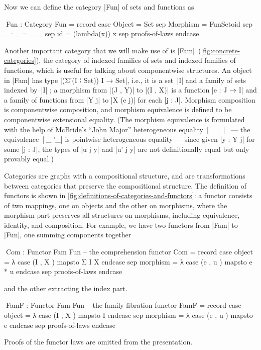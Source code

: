 Now we can define the category |Fun| of sets and functions as
\begin{code}
^^^Fun : Category
Fun = record  case  Object    =  Set
              sep   Morphism  =  FunSetoid
              sep   _·_  =  _∘_
              sep   id   =  (lambda(x)) x
              sep   proofs-of-laws endcase
\end{code}
Another important category that we will make use of is |Fam|~(\autoref{fig:concrete-categories}), the category of indexed families of sets and indexed families of functions, which is useful for talking about componentwise structures.
An object in |Fam| has type |(Σ'(I ∶ Set)) I → Set|, i.e., it is a set~|I| and a family of sets indexed by~|I| ;
a morphism from |(J , Y)| to |(I , X)| is a function |e : J → I| and a family of functions from |Y j| to |X (e j)| for each |j : J|.
Morphism composition is componentwise composition, and morphism equivalence is defined to be componentwise extensional equality.
(The morphism equivalence is formulated with the help of McBride's ``John Major'' heterogeneous equality~|^^^_≊_|~\citep{McBride-thesis} --- the equivalence~|^^^_≊'_| is pointwise heterogeneous equality --- since given |y : Y j| for some |j : J|, the types of |u {j} y| and |u' {j} y| are not definitionally equal but only provably equal.)

Categories are graphs with a compositional structure, and  are transformations between categories that preserve the compositional structure.
The definition of functors is shown in \autoref{fig:definitions-of-categories-and-functors}: a functor consists of two mappings, one on objects and the other on morphisms, where the morphism part preserves all structures on morphisms, including equivalence, identity, and composition.
For example, we have two functors from |Fam| to |Fun|, one summing components together
\begin{code}
^^^Com : Functor Fam Fun  -- the comprehension functor
Com = record  case  object    =  λ case (I  ,  X  ) mapsto Σ I X  endcase
              sep   morphism  =  λ case (e  ,  u  ) mapsto e * u  endcase
              sep   proofs-of-laws endcase
\end{code}
and the other extracting the index part.
\begin{code}
^^^FamF : Functor Fam Fun  -- the family fibration functor
FamF = record  case  object    =  λ case (I  ,  X  ) mapsto I  endcase
               sep   morphism  =  λ case (e  ,  u  ) mapsto e  endcase
               sep   proofs-of-laws endcase
\end{code}
Proofs of the functor laws are omitted from the presentation.

